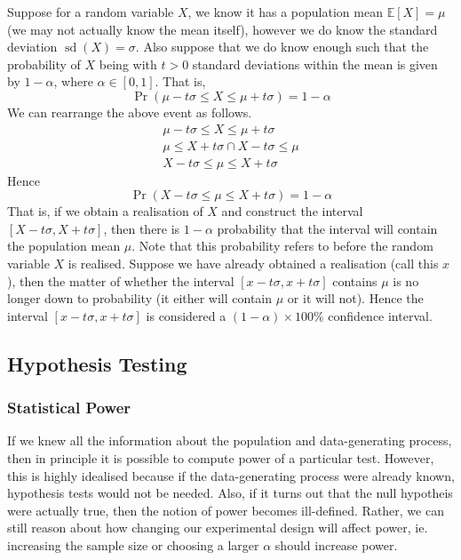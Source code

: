 \documentclass[11pt]{report} %
\begin{document}
Suppose for a random variable $X$, we know it has a population mean $\mathbb{E}\left[X\right] = \mu$ (we may not actually know the mean itself), however we do know the standard deviation $\operatorname{sd}\left(X\right) = \sigma$. Also suppose that we do know enough such that the probability of $X$ being with $t > 0$ standard deviations within the mean is given by $1 - \alpha$, where $\alpha \in \left[0, 1\right]$. That is,
\begin{equation}
\operatorname{Pr}\left(\mu - t\sigma \leq X \leq \mu + t\sigma\right) = 1 - \alpha
\end{equation}
We can rearrange the above event as follows.
\begin{gather}
\mu - t\sigma \leq X \leq \mu + t\sigma \\
\mu \leq X + t\sigma \cap X - t\sigma \leq \mu \\
X - t\sigma \leq \mu \leq X + t\sigma
\end{gather}
Hence
\begin{equation}
\operatorname{Pr}\left(X - t\sigma \leq \mu \leq X + t\sigma\right) = 1 - \alpha
\end{equation}
That is, if we obtain a realisation of $X$ and construct the interval $\left[X - t\sigma, X + t\sigma\right]$, then there is $1 - \alpha$ probability that the interval will contain the population mean $\mu$. Note that this probability refers to before the random variable $X$ is realised. Suppose we have already obtained a realisation (call this $x$), then the matter of whether the interval 
$\left[x - t\sigma, x + t\sigma\right]$ contains $\mu$ is no longer down to probability (it either will contain $\mu$ or it will not). Hence the interval $\left[x - t\sigma, x + t\sigma\right]$ is considered a $\left(1 - \alpha\right)\times 100\%$ confidence interval.

\subsection{Hypothesis Testing}

\subsubsection{Statistical Power}

If we knew all the information about the population and data-generating process, then in principle it is possible to compute power of a particular test. However, this is highly idealised because if the data-generating process were already known, hypothesis tests would not be needed. Also, if it turns out that the null hypotheis were actually true, then the notion of power becomes ill-defined. Rather, we can still reason about how changing our experimental design will affect power, ie. increasing the sample size or choosing a larger $\alpha$ should increase power.
\end{document}
